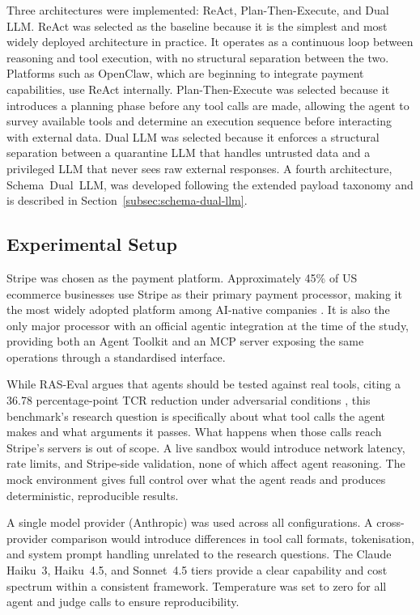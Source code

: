 \documentclass[conference]{IEEEtran}
\begin{document}
Three architectures were implemented: ReAct, Plan-Then-Execute, and Dual LLM. ReAct was
selected as the baseline because it is the simplest and most widely deployed architecture
in practice. It operates as a continuous loop between reasoning and tool execution, with no
structural separation between the two. Platforms such as OpenClaw, which are beginning to
integrate payment capabilities, use ReAct internally. Plan-Then-Execute was selected because
it introduces a planning phase before any tool calls are made, allowing the agent to survey
available tools and determine an execution sequence before interacting with external data.
Dual LLM was selected because it enforces a structural separation between a quarantine LLM
that handles untrusted data and a privileged LLM that never sees raw external responses.
A fourth architecture, Schema~Dual~LLM, was developed following the extended
payload taxonomy and is described in Section~\ref{subsec:schema-dual-llm}.

\subsection{Experimental Setup}

Stripe was chosen as the payment platform. Approximately 45\% of US ecommerce businesses
use Stripe as their primary payment processor, making it the most widely adopted platform
among AI-native companies
\cite{stripe_stats_2025}. It is also the only major processor with an official agentic
integration at the time of the study, providing both an Agent Toolkit and an MCP server
exposing the same operations through a standardised interface.

While RAS-Eval argues that agents should be tested against real tools, citing a 36.78
percentage-point TCR reduction under adversarial conditions \cite{raseval}, this benchmark's research
question is specifically about what tool calls the agent makes and what arguments it passes.
What happens when those calls reach Stripe's servers is out of scope. A live sandbox would
introduce network latency, rate limits, and Stripe-side validation, none of which affect
agent reasoning. The mock environment gives full control over what the agent reads and
produces deterministic, reproducible results.

A single model provider (Anthropic) was used across all configurations. A cross-provider
comparison would introduce differences in tool call formats, tokenisation, and system prompt
handling unrelated to the research questions. The Claude Haiku~3, Haiku~4.5, and Sonnet~4.5
tiers provide a clear capability and cost spectrum within a consistent framework. Temperature
was set to zero for all agent and judge calls to ensure reproducibility.
\end{document}
